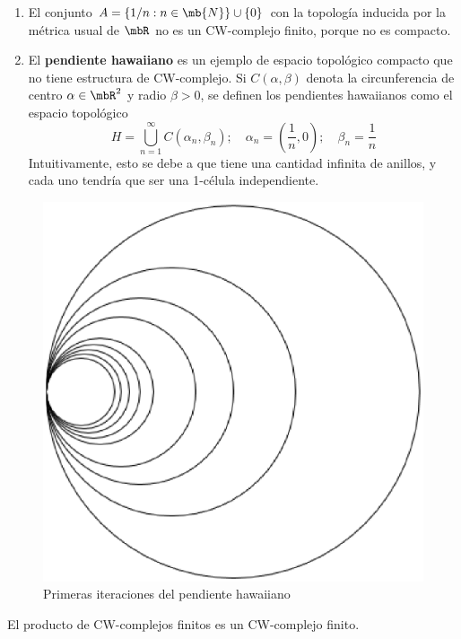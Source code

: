 \begin{ejem}
\begin{enumerate}
\item El conjunto $A=\{1/n: n \in \mb{N}\}\cup \{0\}$ con la topología inducida por la métrica usual de $\mbR$ no es un CW-complejo finito, porque no es compacto.

\item El \textbf{pendiente hawaiiano} es un ejemplo de espacio topológico compacto que no tiene estructura de CW-complejo. Si $C(\alpha,\beta)$ denota la circunferencia de centro $\alpha \in \mbR^2$ y radio $\beta > 0$, se definen los pendientes hawaiianos como el espacio topológico $$H=\bigcup_{n=1}^\infty C(\alpha_n,\beta_n); \quad \alpha_n=\left(\frac{1}{n},0\right); \quad \beta_n=\frac{1}{n}$$ Intuitivamente, esto se debe a que tiene una cantidad infinita de anillos, y cada uno tendría que ser una 1-célula independiente.
\end{enumerate}
\end{ejem}

\begin{figure}[h]
\centering
\includegraphics[scale=0.6]{Figures/Hawaii.eps}
\caption{Primeras iteraciones del pendiente hawaiiano}
\end{figure}

\begin{prop}\label{CWProd} El producto de CW-complejos finitos es un CW-complejo finito.\end{prop}

